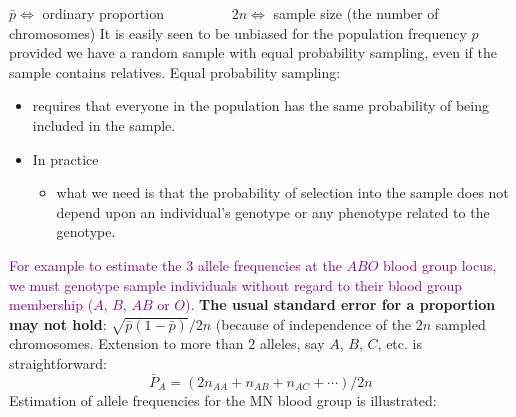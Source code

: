 \documentclass[a4paper,twoside,11pt]{article}
\begin{document}
\newline
\newline
$\bar{p} \Leftrightarrow$ ordinary proportion \ \ \ \ \ \ \ \ \ $2n \Leftrightarrow$ sample size (the number of chromosomes)
\newline
It is easily seen to be unbiased for the population frequency $p$ provided we have a random sample with equal probability sampling, even if the sample contains relatives.
\newline
\newline
Equal probability sampling: 
\begin{itemize}
    \item requires that everyone in the population has the same probability of being included in the sample.
    \item In practice
    \begin{itemize}
        \item what we need is that the probability of selection into the sample does not depend upon an individual’s genotype or any phenotype related to the genotype. 
    \end{itemize}
\end{itemize}
\textcolor{Purple}{For example to estimate the $3$ allele frequencies at the $ABO$ blood group locus, we must genotype sample individuals without regard to their blood group membership ($A$, $B$, $AB$ or $O$).}
\newline
\newline
\textbf{The usual standard error for a proportion may not hold}: $\sqrt{\bar{p}(1-\bar{p})}/2n$ (because of independence of the $2n$ sampled chromosomes. 
\newline
\newline
Extension to more than $2$ alleles, say $A$, $B$, $C$, etc. is straightforward:
$$
\bar{P}_A = (2n_{AA} + n_{AB} + n_{AC} + \cdots )/2n
$$
Estimation of allele frequencies for the MN blood group is illustrated:
\end{document}
